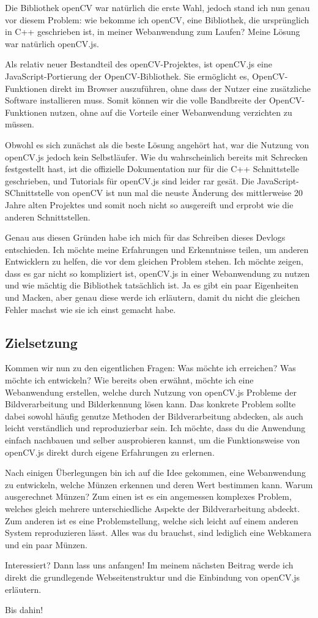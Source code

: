 Die Bibliothek openCV war natürlich die erste Wahl, jedoch stand ich nun genau vor diesem Problem: wie bekomme ich openCV, eine Bibliothek, die ursprünglich in C++ geschrieben ist, in meiner Webanwendung zum Laufen? Meine Lösung war natürlich openCV.js.

Als relativ neuer Bestandteil des openCV-Projektes, ist openCV.js eine JavaScript-Portierung der OpenCV-Bibliothek. Sie ermöglicht es, OpenCV-Funktionen direkt im Browser auszuführen, ohne dass der Nutzer eine zusätzliche Software installieren muss. Somit können wir die volle Bandbreite der OpenCV-Funktionen nutzen, ohne auf die Vorteile einer Webanwendung verzichten zu müssen.

Obwohl es sich zunächst als die beste Lösung angehört hat, war die Nutzung von openCV.js jedoch kein Selbstläufer. Wie du wahrscheinlich bereits mit Schrecken festgestellt hast, ist die offizielle Dokumentation nur für die C++ Schnittstelle geschrieben, und Tutorials für openCV.js sind leider rar gesät. Die JavaScript-SChnittstelle von openCV ist nun mal die neuste Änderung des mittlerweise 20 Jahre alten Projektes und somit noch nicht so ausgereift und erprobt wie die anderen Schnittstellen.

Genau aus diesen Gründen habe ich mich für das Schreiben dieses Devlogs entschieden. Ich möchte meine Erfahrungen und Erkenntnisse teilen, um anderen Entwicklern zu helfen, die vor dem gleichen Problem stehen. Ich möchte zeigen, dass es gar nicht so kompliziert ist, openCV.js in einer Webanwendung zu nutzen und wie mächtig die Bibliothek tatsächlich ist. Ja es gibt ein paar Eigenheiten und Macken, aber genau diese werde ich erläutern, damit du nicht die gleichen Fehler machst wie sie ich einst gemacht habe.

\subsection{Zielsetzung}
Kommen wir nun zu den eigentlichen Fragen: Was möchte ich erreichen? Was möchte ich entwickeln? Wie bereits oben erwähnt, möchte ich eine Webanwendung erstellen, welche durch Nutzung von openCV.js Probleme der Bildverarbeitung und Bilderkennung lösen kann. Das konkrete Problem sollte dabei sowohl häufig genutze Methoden der Bildverarbeitung abdecken, als auch leicht verständlich und reproduzierbar sein. Ich möchte, dass du die Anwendung einfach nachbauen und selber ausprobieren kannst, um die Funktionsweise von openCV.js direkt durch eigene Erfahrungen zu erlernen.

Nach einigen Überlegungen bin ich auf die Idee gekommen, eine Webanwendung zu entwickeln, welche Münzen erkennen und deren Wert bestimmen kann. Warum ausgerechnet Münzen? Zum einen ist es ein angemessen komplexes Problem, welches gleich mehrere unterschiedliche Aspekte der Bildverarbeitung abdeckt. Zum anderen ist es eine Problemstellung, welche sich leicht auf einem anderen System reproduzieren lässt. Alles was du brauchst, sind lediglich eine Webkamera und ein paar Münzen.

Interessiert? Dann lass uns anfangen! Im meinem nächsten Beitrag werde ich direkt die grundlegende Webseitenstruktur und die Einbindung von openCV.js erläutern. 

Bis dahin!